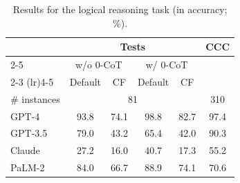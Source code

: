 \begin{table}[t!]
    \centering
    \begin{tabular}{lccccc}
        \toprule
        & \multicolumn{4}{c}{Tests} & \multirow{3}{*}{CCC} \\
        \cmidrule(lr){2-5}
        & \multicolumn{2}{c}{w/o 0-CoT} & \multicolumn{2}{c}{w/ 0-CoT} \\
        \cmidrule(lr){2-3}
        \cmidrule(lr){4-5}
        & Default & CF & Default & CF \\
        \midrule
        \# instances & \multicolumn{4}{c}{81} & 310 \\
        \midrule
        GPT-4 & 93.8 & 74.1 & 98.8 & 82.7 & 97.4 \\
        GPT-3.5 & 79.0 & 43.2 & 65.4 & 42.0 & 90.3 \\
        Claude & 27.2 & 16.0 & 40.7 & 17.3 & 55.2 \\
        PaLM-2 & 84.0 & 66.7 & 88.9 & 74.1 & 70.6 \\
        \bottomrule
    \end{tabular}
    \caption{
    Results for the logical reasoning task (in accuracy; \%).
    }
\end{table}
